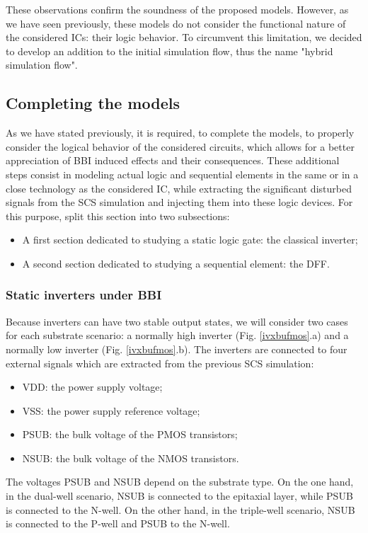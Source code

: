 	These observations confirm the soundness of the proposed models.
	However, as we have seen previously, these models do not consider the functional nature of the considered ICs: their logic behavior.
	To circumvent this limitation, we decided to develop an addition to the initial simulation flow, thus the name "hybrid simulation flow".

\subsection{Completing the models}
	As we have stated previously, it is required, to complete the models, to properly consider the logical behavior of the considered circuits, which allows for a better appreciation of BBI induced effects and their consequences.
	These additional steps consist in modeling actual logic and sequential elements in the same or in a close technology as the considered IC, while extracting the significant disturbed signals from the SCS simulation and injecting them into these logic devices.
	For this purpose, split this section into two subsections:
	\begin{itemize}
		\item A first section dedicated to studying a static logic gate: the classical inverter;
		\item A second section dedicated to studying a sequential element: the DFF.
	\end{itemize}

	\subsubsection{Static inverters under BBI}
		
		Because inverters can have two stable output states, we will consider two cases for each substrate scenario: a normally high inverter (Fig. \ref{ivxbufmos}.a) and a normally low inverter (Fig. \ref{ivxbufmos}.b).
		The inverters are connected to four external signals which are extracted from the previous SCS simulation:
		\begin{itemize}
				\item VDD: the power supply voltage;
				\item VSS: the power supply reference voltage;
				\item PSUB: the bulk voltage of the PMOS transistors;
				\item NSUB: the bulk voltage of the NMOS transistors.
			\end{itemize}
		The voltages PSUB and NSUB depend on the substrate type.
		On the one hand, in the dual-well scenario, NSUB is connected to the epitaxial layer, while PSUB is connected to the N-well.
		On the other hand, in the triple-well scenario, NSUB is connected to the P-well and PSUB to the N-well.
		
